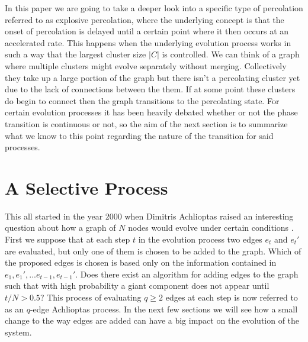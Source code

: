 In this paper we are going to take a deeper look into a specific type of percolation referred to as explosive percolation, where the underlying concept is that the onset of percolation is delayed until a certain point where it then occurs at an accelerated rate.
This happens when the underlying evolution process works in such a way that the largest cluster size $|C|$ is controlled.
We can think of a graph where multiple clusters might evolve separately without merging.
Collectively they take up a large portion of the graph but there isn't a percolating cluster yet due to the lack of connections between the them.
If at some point these clusters do begin to connect then the graph transitions to the percolating state.
For certain evolution processes it has been heavily debated whether or not the phase transition is continuous or not, so the aim of the next section is to summarize what we know to this point regarding the nature of the transition for said processes.



\section{A Selective Process}
This all started in the year 2000 when Dimitris Achlioptas raised an interesting question about how a graph of $N$ nodes would evolve under certain conditions \cite{BF}.
First we suppose that at each step $t$ in the evolution process two edges $e_t$ and $e_t'$ are evaluated, but only one of them is chosen to be added to the graph.
Which of the proposed edges is chosen is based only on the information contained in $e_1, e_1', ... e_{t-1}, e_{t-1}'$.
Does there exist an algorithm for adding edges to the graph such that with high probability a giant component does not appear until $t/N > 0.5$?
This process of evaluating $q \ge 2$ edges at each step is now referred to as an $q$-edge Achlioptas process.
In the next few sections we will see how a small change to the way edges are added can have a big impact on the evolution of the system.



